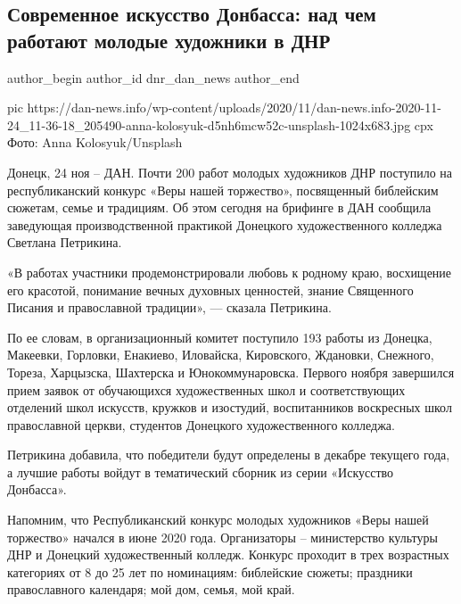  
 
 
 
 
 
\subsection{Современное искусство Донбасса: над чем работают молодые художники в ДНР}
\label{sec:24_11_2020.news.dnr.dan.dnr_dan_news.1.sovremennoje_iskusstvo_donbassa}
\ifcmt
	author_begin
   author_id dnr_dan_news
	author_end
\fi

\ifcmt
pic https://dan-news.info/wp-content/uploads/2020/11/dan-news.info-2020-11-24_11-36-18_205490-anna-kolosyuk-d5nh6mcw52c-unsplash-1024x683.jpg
cpx Фото: Anna Kolosyuk/Unsplash
\fi

Донецк, 24 ноя – ДАН. Почти 200 работ молодых художников ДНР поступило на
республиканский конкурс «Веры нашей торжество», посвященный библейским сюжетам,
семье и традициям. Об этом сегодня на брифинге в ДАН сообщила заведующая
производственной практикой Донецкого художественного колледжа Светлана
Петрикина.

«В работах участники продемонстрировали любовь к родному краю, восхищение его
красотой, понимание вечных духовных ценностей, знание Священного Писания и
православной традиции», — сказала Петрикина.

По ее словам, в организационный комитет поступило 193 работы из Донецка,
Макеевки, Горловки, Енакиево, Иловайска, Кировского, Ждановки, Снежного,
Тореза, Харцызска, Шахтерска и Юнокоммунаровска. Первого ноября завершился
прием заявок от обучающихся художественных школ и соответствующих отделений
школ искусств, кружков и изостудий, воспитанников воскресных школ православной
церкви, студентов Донецкого художественного колледжа.

Петрикина добавила, что победители будут определены в декабре текущего года, а
лучшие работы войдут в тематический сборник из серии «Искусство Донбасса».

Напомним, что Республиканский конкурс молодых художников «Веры нашей торжество»
начался в июне 2020 года. Организаторы – министерство культуры ДНР и Донецкий
художественный колледж. Конкурс проходит в трех возрастных категориях от 8 до
25 лет по номинациям: библейские сюжеты; праздники православного календаря; мой
дом, семья, мой край.

